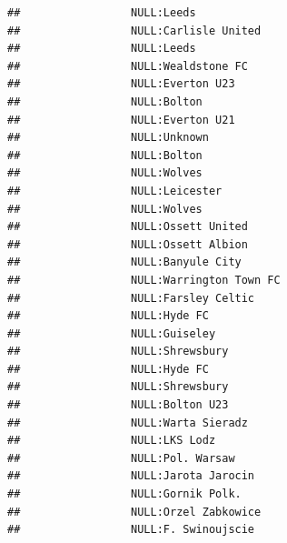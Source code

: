 \documentclass{article}\usepackage[]{graphicx}\usepackage[]{color}
\makeatletter
\newenvironment{kframe}{%
 \def\at@end@of@kframe{}%
 \ifinner\ifhmode%
  \def\at@end@of@kframe{\end{minipage}}%
  \begin{minipage}{\columnwidth}%
 \fi\fi%
 \def\FrameCommand##1{\hskip\@totalleftmargin \hskip-\fboxsep
 \colorbox{shadecolor}{##1}\hskip-\fboxsep
     \hskip-\linewidth \hskip-\@totalleftmargin \hskip\columnwidth}%
 \MakeFramed {\advance\hsize-\width
   \@totalleftmargin\z@ \linewidth\hsize
   \@setminipage}}%
 {\par\unskip\endMakeFramed%
 \at@end@of@kframe}
\newenvironment{knitrout}{}{} %
\makeatother
\begin{document}
\begin{knitrout}
\begin{kframe}
\begin{verbatim}
##                 NULL:Leeds                                                         
##                 NULL:Carlisle United                                               
##                 NULL:Leeds                                                         
##                 NULL:Wealdstone FC                                                 
##                 NULL:Everton U23                                                   
##                 NULL:Bolton                                                        
##                 NULL:Everton U21                                                   
##                 NULL:Unknown                                                       
##                 NULL:Bolton                                                        
##                 NULL:Wolves                                                        
##                 NULL:Leicester                                                     
##                 NULL:Wolves                                                        
##                 NULL:Ossett United                                                 
##                 NULL:Ossett Albion                                                 
##                 NULL:Banyule City                                                  
##                 NULL:Warrington Town FC                                            
##                 NULL:Farsley Celtic                                                
##                 NULL:Hyde FC                                                       
##                 NULL:Guiseley                                                      
##                 NULL:Shrewsbury                                                    
##                 NULL:Hyde FC                                                       
##                 NULL:Shrewsbury                                                    
##                 NULL:Bolton U23                                                    
##                 NULL:Warta Sieradz                                                 
##                 NULL:LKS Lodz                                                      
##                 NULL:Pol. Warsaw                                                   
##                 NULL:Jarota Jarocin                                                
##                 NULL:Gornik Polk.                                                  
##                 NULL:Orzel Zabkowice                                               
##                 NULL:F. Swinoujscie                                                

\end{verbatim}
\end{kframe}
\end{knitrout}
\end{document}
